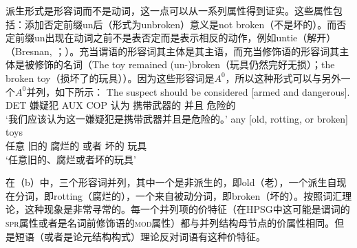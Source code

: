 \noindent
派生形式是形容词而不是动词，这一点可以从一系列属性得到证实。这些属性包括：添加否定前缀un后（形式为unbroken）意义是not broken（不是坏的）。而否定前缀un出现在动词之前不是表否定而是表示相反的动作，例如untie（解开）（Bresnan, \citeyear[]{Bresnan82a}；\citeyear[\S~3]{Bresnan2001a}）。充当谓语的形容词其主体是其主语，而充当修饰语的形容词其主体是被修饰的名词（The toy remained (un-)broken（玩具仍然完好无损）；the broken toy（损坏了的玩具））。因为这些形容词是$A^0$，所以这种形式可以与另外一个$A^0$并列，如下所示：
\eal
\ex 
\gll The suspect should be considered [armed and dangerous].\\
    DET 嫌疑犯 AUX COP 认为 携带武器的 并且 危险的\\
\glt `我们应该认为这一嫌疑犯是携带武器并且是危险的。' 
\ex 
\gll any [old, rotting, or broken] toys\\
    任意 旧的 腐烂的 或者 坏的 玩具\\
\glt `任意旧的、腐烂或者坏的玩具' 
\zl

\noindent
在（b）中，三个形容词并列，其中一个是非派生的，即old（老），一个派生自现在分词，即rotting（腐烂的），一个来自被动分词，即broken（坏的）。按照词汇理论，这种现象是非常寻常的。每一个\azeroc 并列项的价特征（在HPSG中这可能是谓词的\textsc{spr}属性或者是名词前修饰语的\textsc{mod}属性）都与并列结构母节点的价属性相同。但是短语（或者是论元结构构式）理论反对词语有这种价特征。



